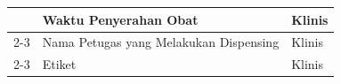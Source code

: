 \begin{longtable}{|p{4cm}|p{5.2cm}|p{3.2cm}|}
	                              & Waktu Penyerahan Obat
	                              & Klinis                                 \\ \cline{2-3}

	                              & Nama Petugas yang Melakukan Dispensing
	                              & Klinis                                 \\ \cline{2-3}

	                              & Etiket
	                              & Klinis                                 \\ \hline
\end{longtable}